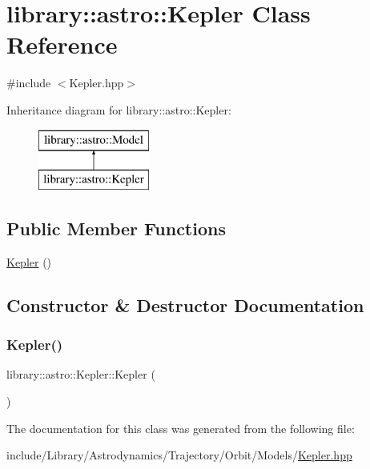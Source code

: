 \hypertarget{classlibrary_1_1astro_1_1_kepler}{}\section{library\+:\+:astro\+:\+:Kepler Class Reference}
\label{classlibrary_1_1astro_1_1_kepler}


{\ttfamily \#include $<$Kepler.\+hpp$>$}

Inheritance diagram for library\+:\+:astro\+:\+:Kepler\+:\begin{figure}[H]
\begin{center}
\leavevmode
\includegraphics[height=2.000000cm]{classlibrary_1_1astro_1_1_kepler}
\end{center}
\end{figure}
\subsection*{Public Member Functions}
\begin{DoxyCompactItemize}
\item 
\hyperlink{classlibrary_1_1astro_1_1_kepler_a8bba54b94e64c360f5dab3999fde0675}{Kepler} ()
\end{DoxyCompactItemize}


\subsection{Constructor \& Destructor Documentation}
\mbox{\label{classlibrary_1_1astro_1_1_kepler_a8bba54b94e64c360f5dab3999fde0675}} 
\subsubsection{\texorpdfstring{Kepler()}{Kepler()}}
{\footnotesize\ttfamily library\+::astro\+::\+Kepler\+::\+Kepler (\begin{DoxyParamCaption}{ }\end{DoxyParamCaption})}



The documentation for this class was generated from the following file\+:\begin{DoxyCompactItemize}
\item 
include/\+Library/\+Astrodynamics/\+Trajectory/\+Orbit/\+Models/\hyperlink{_kepler_8hpp}{Kepler.\+hpp}\end{DoxyCompactItemize}
